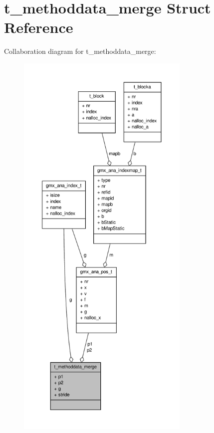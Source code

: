 \hypertarget{structt__methoddata__merge}{\section{t\-\_\-methoddata\-\_\-merge \-Struct \-Reference}
\label{structt__methoddata__merge}
}


\-Collaboration diagram for t\-\_\-methoddata\-\_\-merge\-:
\nopagebreak
\begin{figure}[H]
\begin{center}
\leavevmode
\includegraphics[height=550pt]{structt__methoddata__merge__coll__graph}
\end{center}
\end{figure}

